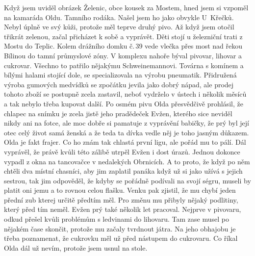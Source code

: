 
Když jsem uviděl obrázek Želenic, obce kousek za Mostem, hned jsem si
vzpoměl na kamaráda Oldu. Tamního rodáka. Našel jsem ho jako obvykle
U~Křečků. Nebyl úplně ve svý kůži, protože měl teprve druhý pivo. Až
když jsem otočil třikrát zelenou, začal přicházet k sobě a vyprávět.
Děti stojí u železniční trati z Mostu do Teplic. Kolem drážního domku
č.\,39 vede vlečka přes most nad řekou Bílinou do tamní průmyslové zóny.
V komplexu nahoře býval pivovar, lihovar a cukrovar. Všechno to
patřilo nějakýmu Schweinemannovi. Továrna s komínem a bílými halami
stojící dole, se specializovala na výrobu pneumatik. Přidružená výroba
gumových medvídků se zpočátku jevila jako dobrý nápad, ale prodej
tohoto zboží se postupně zcela zastavil, neboť vydrželo v ústech i
několik měsíců a tak nebylo třeba kupovat další. Po osmém pivu Olda
přesvědčivě prohlásil, že chlapec na snímku je zcela jistě jeho
pradědeček Evžen, kterého sice neviděl nikdy ani na fotce, ale moc
dobře si pamatuje z vyprávění babičky, že prý byl její otec celý život
samá ženská a že teda ta dívka vedle něj je toho jasným důkazem. Olda
je fakt frajer. Co ho znám tak chlastá první ligu, ale pořád mu to
pálí. Dál vyprávěl, že právě kvůli této zálibě utrpěl Evžen i dost
úrazů. Jednou dokonce vypadl z okna na tancovačce v nedalekých
Obrnicích. A to proto, že když po něm chtěli dva místní chasníci, aby
jim zaplatil panáka když už si jako užívá s jejich sestrou, tak jim
odpověděl, že kdyby se pořádně podívali na svojí ségru, museli by
platit oni jemu a to rovnou celou flašku. Venku pak zjistil, že mu
chybí jeden přední zub kterej určitě předtím měl. Pro změnu mu přibyly
nějaký podlitiny, který před tím neměl. Evžen prý také několik let
pracoval. Nejprve v pivovaru, odkud přešel kvůli problémům s ledvinami
do lihovaru. Tam zase musel po nějakém čase skončit, protože mu začaly
    tvrdnout játra. Na jeho obhajobu je třeba poznamenat, že cukrovku
    měl už před nástupem do cukrovaru. Co říkal Olda dál už nevím,
    protože jsem usnul na stole.


